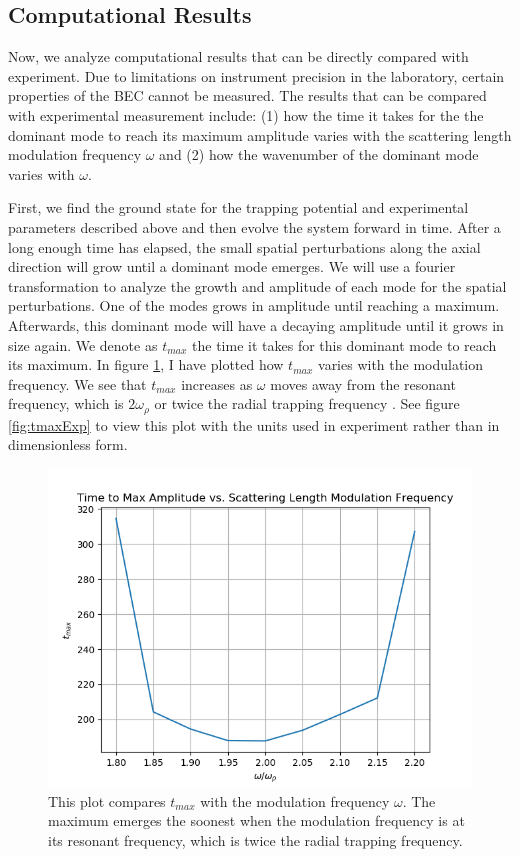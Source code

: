\documentclass[12]{article}
\begin{document}
\subsection{Computational Results}
\label{subsec:CompResults}

Now, we analyze computational results that can be directly compared with experiment. Due to limitations on instrument precision in the laboratory, certain properties of the BEC cannot be measured. The results that can be compared with experimental measurement include: (1) how the time it takes for the the dominant mode to reach its maximum amplitude varies with the scattering length modulation frequency $\omega$ and (2) how the wavenumber of the dominant mode varies with $\omega$.

First, we find the ground state for the trapping potential and experimental parameters described above and then evolve the system forward in time. After a long enough time has elapsed, the small spatial perturbations along the axial direction will grow until a dominant mode emerges. We will use a fourier transformation to analyze the growth and amplitude of each mode for the spatial perturbations. One of the modes grows in amplitude until reaching a maximum. Afterwards, this dominant mode will have a decaying amplitude until it grows in size again. We denote as $t_{max}$ the time it takes for this dominant mode to reach its maximum. In figure \ref{fig:tmaxNat}, I have plotted how $t_{max}$ varies with the modulation frequency. We see that $t_{max}$ increases as $\omega$ moves away from the resonant frequency, which is $2\omega_\rho$ or twice the radial trapping frequency \cite{mustafa}. See figure \ref{fig:tmaxExp} to view this plot with the units used in experiment rather than in dimensionless form.

\begin{figure}[H]
\centering
\includegraphics[scale=0.9]{tmaxNatUnits}
\caption{This plot compares $t_{max}$ with the modulation frequency $\omega$. The maximum emerges the soonest when the modulation frequency is at its resonant frequency, which is twice the radial trapping frequency.}
\label{fig:tmaxNat}
\end{figure}
\end{document}
